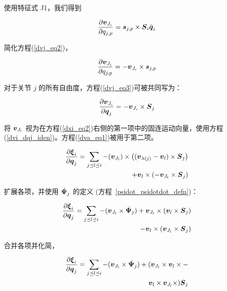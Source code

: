 \documentclass[letterpaper, 10 pt, conference]{ieeetran}  %
\begin{document}
{\begin{enumerate}
使用特征式 J1，我们得到

\begin{equation}
    \frac{\partial \vJ{i}}{\partial q_{j,p}} = \phibar_{j,p} \times \Phibar_{i} \qd_{i}
    \label{dvj_eq2}
\end{equation}

简化方程(\ref{dvj_eq2})，

\begin{equation}
    \frac{\partial \vJ{i}}{\partial q_{j,p}} = - \vJ{i} \times \phibar_{j,p}
    \label{dvj_eq3}
\end{equation}

对于关节 $j$ 的所有自由度，方程(\ref{dvj_eq3})可被共同写为：

\begin{equation}
    \frac{\partial \vJ{i}}{\partial \q_{j}} = - \vJ{i} \times \Phibar_{j}
    \label{dvji_dqj}
\end{equation}

将 $\boldsymbol{v}_{J_{l}}$ 视为在方程(\ref{dxi_eq2})右侧的第一项中的固连运动向量，使用方程(\ref{dvi_dqj_iden})。方程(\ref{dva_eq1})被用于第二项。

\begin{equation}
    \begin{aligned}
        \frac{\partial \xibar_{i}}{\partial \q_{j}} = \sum_{j \preceq l \preceq i} -(\vJ{l}) \times \big( (\v_{\lambda(j)} - \v_{l} )  \times \Phibar_{j} \big ) \\
        + \v_{l} \times (-\vJ{l} \times \Phibar_{j})
        \label{dxi_eq3}
    \end{aligned}
\end{equation}

扩展各项，并使用 $\,\dot{\!\boldsymbol{\Psi}}_{j}$ 的定义 (方程~\ref{psidot_psidotdot_defn})：

\begin{equation}
    \begin{aligned}
       \frac{\partial \xibar_{i}}{\partial \q_{j}} = \sum_{j \preceq l \preceq i} -(\vJ{l} \times \Psibardot_{j}) + \vJ{l} \times (\v_{l} \times \Phibar_{j})  \\
       - \v_{l} \times (\vJ{l} \times \Phibar_{j})
        \label{dxi_eq4}
    \end{aligned}
\end{equation}

合并各项并化简，

\begin{equation}
    \begin{aligned}
        \frac{\partial \xibar_{i}}{\partial \q_{j}} = \sum_{j \preceq l \preceq i} -(\vJ{l} \times \Psibardot_{j}) + ( \vJ{l} \times \v_{l} \times - \\
        \v_{l} \times \vJ{l} \times) \Phibar_{j}   \label{dxi_eq5}
    \end{aligned}
\end{equation}


\end{enumerate}}
\end{document}
